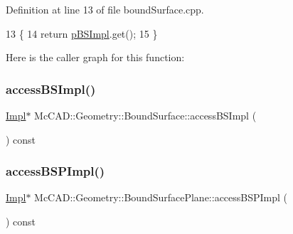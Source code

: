 Definition at line 13 of file bound\+Surface.\+cpp.


\begin{DoxyCode}
13                                              \{
14   \textcolor{keywordflow}{return} \hyperlink{classMcCAD_1_1Geometry_1_1BoundSurface_ae678fabb46e22b7a68a336051b366ddf}{pBSImpl}.get();
15 \}
\end{DoxyCode}
Here is the caller graph for this function\+:
\mbox{\label{classMcCAD_1_1Geometry_1_1BoundSurface_a7b638aa31593926d6210aad6a30e1f47}} 
\subsubsection{\texorpdfstring{access\+B\+S\+Impl()}{accessBSImpl()}\hspace{0.1cm}{\footnotesize\ttfamily [2/2]}}
{\footnotesize\ttfamily \hyperlink{classMcCAD_1_1Geometry_1_1BoundSurfacePlane_1_1Impl}{Impl}$\ast$ Mc\+C\+A\+D\+::\+Geometry\+::\+Bound\+Surface\+::access\+B\+S\+Impl (\begin{DoxyParamCaption}{ }\end{DoxyParamCaption}) const\hspace{0.3cm}{\ttfamily [inherited]}}

\mbox{\label{classMcCAD_1_1Geometry_1_1BoundSurfacePlane_a732e43c447773423af23331af5f18da0}} 
\subsubsection{\texorpdfstring{access\+B\+S\+P\+Impl()}{accessBSPImpl()}\hspace{0.1cm}{\footnotesize\ttfamily [1/2]}}
{\footnotesize\ttfamily \hyperlink{classMcCAD_1_1Geometry_1_1BoundSurfacePlane_1_1Impl}{Impl}$\ast$ Mc\+C\+A\+D\+::\+Geometry\+::\+Bound\+Surface\+Plane\+::access\+B\+S\+P\+Impl (\begin{DoxyParamCaption}{ }\end{DoxyParamCaption}) const}

